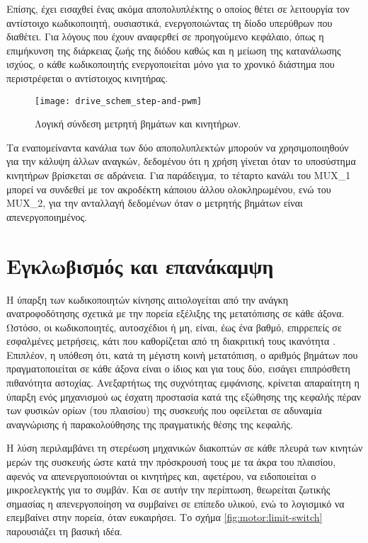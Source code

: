 Επίσης, έχει εισαχθεί ένας ακόμα αποπολυπλέκτης ο οποίος θέτει σε λειτουργία
τον αντίστοιχο κωδικοποιητή, ουσιαστικά, ενεργοποιώντας τη δίοδο υπερύθρων που
διαθέτει. Για λόγους που έχουν αναφερθεί σε προηγούμενο κεφάλαιο, όπως η
επιμήκυνση της διάρκειας ζωής της διόδου καθώς και η μείωση της κατανάλωσης
ισχύος, ο κάθε κωδικοποιητής ενεργοποιείται μόνο για το χρονικό διάστημα που
περιστρέφεται ο αντίστοιχος κινητήρας.

\begin{figure}
    \caption{Λογική σύνδεση μετρητή βημάτων και κινητήρων.
    \label{fig:motor:route_steps}}
    \begin{center}
    \texttt{[image: drive\_schem\_step-and-pwm]}
    \end{center}
\end{figure}

Τα εναπομείναντα κανάλια των δύο αποπολυπλεκτών μπορούν να χρησιμοποιηθούν για
την κάλυψη άλλων αναγκών, δεδομένου ότι η χρήση γίνεται όταν το υποσύστημα
κινητήρων βρίσκεται σε αδράνεια. Για παράδειγμα, το τέταρτο κανάλι του MUX\_1
μπορεί να συνδεθεί με τον ακροδέκτη  κάποιου άλλου ολοκληρωμένου, ενώ
του MUX\_2, για την ανταλλαγή δεδομένων όταν ο μετρητής βημάτων είναι
απενεργοποιημένος.

\section{Εγκλωβισμός και επανάκαμψη}
\label{sec:motor:backtrack}

Η ύπαρξη των κωδικοποιητών κίνησης αιτιολογείται από την ανάγκη ανατροφοδότησης
σχετικά με την πορεία εξέλιξης της μετατόπισης σε κάθε άξονα. Ωστόσο, οι
κωδικοποιητές, αυτοσχέδιοι ή μη, είναι, έως ένα βαθμό, επιρρεπείς σε εσφαλμένες
μετρήσεις, κάτι που καθορίζεται από τη διακριτική τους ικανότητα
\parencite[15--16]{albert11}. Επιπλέον, η υπόθεση ότι, κατά τη μέγιστη κοινή
μετατόπιση, ο αριθμός βημάτων που πραγματοποιείται σε κάθε άξονα είναι ο ίδιος
και για τους δύο, εισάγει επιπρόσθετη πιθανότητα αστοχίας. Ανεξαρτήτως της
συχνότητας εμφάνισης, κρίνεται απαραίτητη η ύπαρξη ενός μηχανισμού ως έσχατη
προστασία κατά της εξώθησης της κεφαλής πέραν των φυσικών ορίων (του πλαισίου)
της συσκευής που οφείλεται σε αδυναμία αναγνώρισης ή παρακολούθησης της
πραγματικής θέσης της κεφαλής.

Η λύση περιλαμβάνει τη στερέωση μηχανικών διακοπτών σε κάθε πλευρά των κινητών
μερών της συσκευής ώστε κατά την πρόσκρουσή τους με τα άκρα του πλαισίου, αφενός
να απενεργοποιούνται οι κινητήρες και, αφετέρου, να ειδοποιείται ο μικροελεγκτής
για το συμβάν. Και σε αυτήν την περίπτωση, θεωρείται ζωτικής σημασίας η
απενεργοποίηση να συμβαίνει σε επίπεδο υλικού, ενώ το λογισμικό να επεμβαίνει
στην πορεία, όταν ευκαιρήσει. Το σχήμα \ref{fig:motor:limit-switch} παρουσιάζει
τη βασική ιδέα.

